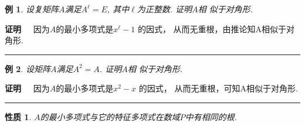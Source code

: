 \documentclass[13pt]{beamer}
\newtheorem{exa}{例}
\newtheorem*{prop}{性质}
\def\qed{\nopagebreak\hfill{\rule{4pt}{7pt}}\medbreak}
\def\pf{{\bf 证明~~ }}
\begin{document}
\begin{frame}
\begin{exa}
设复矩阵$A$满足$A^\ell=E$, 其中$\ell$为正整数. 证明$A$相
似于对角形. 
\end{exa} 
\pf 因为$A$的最小多项式是$x^\ell-1$ 的因式，
从而无重根，由推论知A相似于对角形. 
\qed

\begin{exa}
	设矩阵$A$满足$A^{2}=A$. 证明$A$相
	似于对角形. 
\end{exa} 
\pf 因为$A$的最小多项式是$x^2-x$ 的因式，
从而无重根，可知A相似于对角形. 
\qed
\end{frame}


\begin{frame}
\begin{prop}
$A$的最小多项式与它的特征多项式在数域$P$中有相同的根.
\end{prop}

\end{frame}
\end{document}
